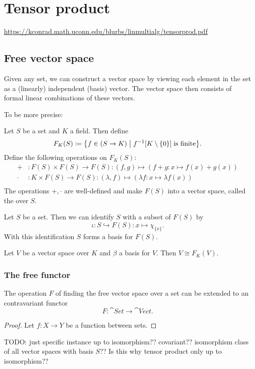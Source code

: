 \section{Tensor product}
\url{https://kconrad.math.uconn.edu/blurbs/linmultialg/tensorprod.pdf}
\subsection{Free vector space}
Given any set, we can construct a vector space by viewing each element in the set as a (linearly) independent (basis) vector. The vector space then consists of formal linear combinations of these vectors.

To be more precise:
\begin{definition}
Let $S$ be a set and $K$ a field. Then define
\[ F_K(S) \defeq \setbuilder{f\in(S\to K)}{f^{-1}[K\setminus\{0\}]\;\text{is finite}}. \]
Define the following operations on $F_K(S)$:
\begin{align*}
+ &: F(S)\times F(S) \to F(S): (f,g)\mapsto (f+g: x\mapsto f(x)+g(x)) \\
\cdot &: K\times F(S) \to F(S): (\lambda,f)\mapsto (\lambda f: x\mapsto \lambda f(x)) \\
\end{align*}
The operations $+,\cdot$ are well-defined and make $F(S)$ into a vector space, called the  over $S$.
\end{definition}

\begin{proposition}
Let $S$ be a set. Then we can identify $S$ with a subset of $F(S)$ by
\[ \iota: S\hookrightarrow F(S): x\mapsto \chi_{\{x\}}. \]
With this identification $S$ forms a basis for $F(S)$.
\end{proposition}

\begin{lemma}
Let $V$ be a vector space over $K$ and $\beta$ a basis for $V$. Then $V\cong  F_K(V)$.
\end{lemma}

\subsubsection{The free functor}
\begin{proposition}
The operation $F$ of finding the free vector space over a set can be extended to an contravariant functor
\[ F: \cat{Set} \to \cat{Vect}. \]
\end{proposition}
\begin{proof}
Let $f:X\to Y$ be a function between sets.
\end{proof}
TODO: just specific instance up to isomorphism?? covariant?? isomorphism class of all vector spaces with basis $S$?? Is this why tensor product only up to isomorphism??

